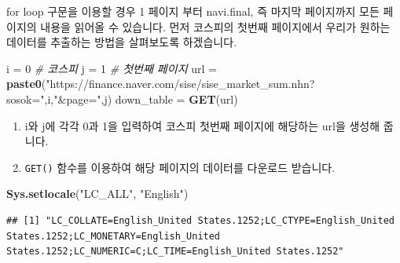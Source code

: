 \documentclass[]{book}
\newenvironment{Shaded}{\begin{snugshade}}{\end{snugshade}}
\newcommand{\CommentTok}[1]{\textcolor[rgb]{0.56,0.35,0.01}{\textit{#1}}}
\newcommand{\DataTypeTok}[1]{\textcolor[rgb]{0.13,0.29,0.53}{#1}}
\newcommand{\DecValTok}[1]{\textcolor[rgb]{0.00,0.00,0.81}{#1}}
\newcommand{\KeywordTok}[1]{\textcolor[rgb]{0.13,0.29,0.53}{\textbf{#1}}}
\newcommand{\NormalTok}[1]{#1}
\newcommand{\OperatorTok}[1]{\textcolor[rgb]{0.81,0.36,0.00}{\textbf{#1}}}
\newcommand{\OtherTok}[1]{\textcolor[rgb]{0.56,0.35,0.01}{#1}}
\newcommand{\StringTok}[1]{\textcolor[rgb]{0.31,0.60,0.02}{#1}}
\providecommand{\tightlist}{%
  \setlength{\itemsep}{0pt}\setlength{\parskip}{0pt}}
\begin{document}
for loop 구문을 이용할 경우 1 페이지 부터 navi.final, 즉 마지막 페이지까지 모든 페이지의 내용을 읽어올 수 있습니다. 먼저 코스피의 첫번째 페이지에서 우리가 원하는 데이터를 추출하는 방법을 살펴보도록 하겠습니다.

\begin{Shaded}
\begin{Highlighting}[]
\NormalTok{i =}\StringTok{ }\DecValTok{0} \CommentTok{# 코스피}
\NormalTok{j =}\StringTok{ }\DecValTok{1} \CommentTok{# 첫번째 페이지}
\NormalTok{url =}\StringTok{ }\KeywordTok{paste0}\NormalTok{(}\StringTok{"https://finance.naver.com/sise/sise_market_sum.nhn?sosok="}\NormalTok{,i,}\StringTok{"&page="}\NormalTok{,j)}
\NormalTok{down_table =}\StringTok{ }\KeywordTok{GET}\NormalTok{(url)}
\end{Highlighting}
\end{Shaded}

\begin{enumerate}
\def\labelenumi{\arabic{enumi}.}
\tightlist
\item
  i와 j에 각각 0과 1을 입력하여 코스피 첫번째 페이지에 해당하는 url을 생성해 줍니다.
\item
  \texttt{GET()} 함수를 이용하여 해당 페이지의 데이터를 다운로드 받습니다.
\end{enumerate}

\begin{Shaded}
\begin{Highlighting}[]
\KeywordTok{Sys.setlocale}\NormalTok{(}\StringTok{"LC_ALL"}\NormalTok{, }\StringTok{"English"}\NormalTok{)}
\end{Highlighting}
\end{Shaded}

\begin{verbatim}
## [1] "LC_COLLATE=English_United States.1252;LC_CTYPE=English_United States.1252;LC_MONETARY=English_United States.1252;LC_NUMERIC=C;LC_TIME=English_United States.1252"
\end{verbatim}

\begin{Shaded}
\end{Shaded}
\end{document}
